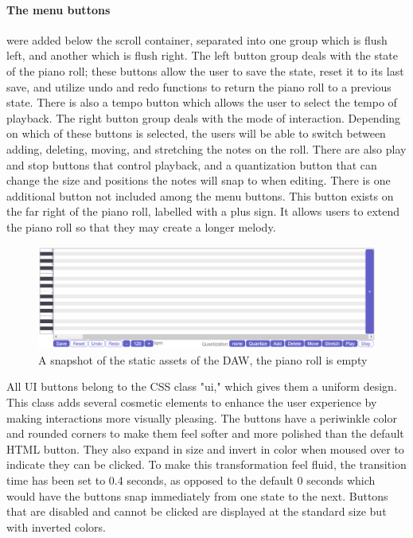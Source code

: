 \paragraph{The menu buttons} were added below the scroll container, separated into one group which is flush
left, and another which is flush right. The left button group deals with the state of the piano
roll; these buttons allow the user to save the state, reset it to its last save, and utilize undo and
redo functions to return the piano roll to a previous state. There is also a tempo button which
allows the user to select the tempo of playback. The right button group deals with the mode of
interaction. Depending on which of these buttons is selected, the users will be able to switch
between adding, deleting, moving, and stretching the notes on the roll. There are also play and
stop buttons that control playback, and a quantization button that can change the size and
positions the notes will snap to when editing. There is one additional button not included among
the menu buttons. This button exists on the far right of the piano roll, labelled with a plus sign.
It allows users to extend the piano roll so that they may create a longer melody.

\begin{figure}[h!]
  \centering
  \includegraphics[width=\linewidth]{image/Static.png}
  \caption{A snapshot of the static assets of the DAW, the piano roll is empty}
  \label{fig:static}
\end{figure}

All UI buttons belong to the CSS class "ui," which gives them a uniform design. This class adds
several cosmetic elements to enhance the user experience by making interactions more visually
pleasing. The buttons have a periwinkle color and rounded corners to make them feel softer and
more polished than the default HTML button. They also expand in size and invert in color when
moused over to indicate they can be clicked. To make this transformation feel fluid, the transition
time has been set to 0.4 seconds, as opposed to the default 0 seconds which would have the buttons
snap immediately from one state to the next. Buttons that are disabled and cannot be clicked are
displayed at the standard size but with inverted colors.

